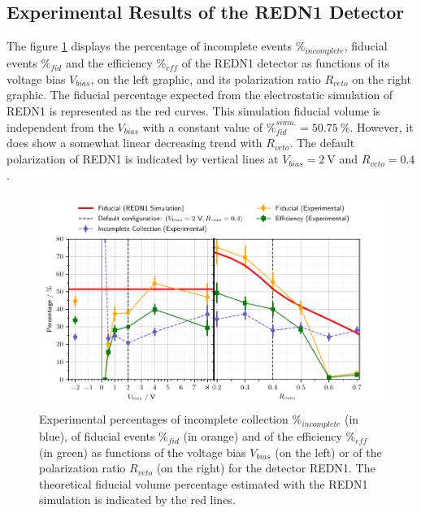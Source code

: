\subsection{Experimental Results of the REDN1 Detector}

The figure \ref{fig:redn1-experimental-fiducial-volume} displays the percentage of incomplete events $\%_{incomplete}$, fiducial events $\%_{fid}$ and the efficiency $\%_{eff}$ of the REDN1 detector as functions of its voltage bias $V_{bias}$, on the left graphic, and its polarization ratio $R_{veto}$ on the right graphic. The fiducial percentage expected from the electrostatic simulation of REDN1 is represented as the red curves. This simulation fiducial volume is independent from the $V_{bias}$ with a constant value of $\%_{fid}^{simu.}=\SI{50.75}{\percent}$. However, it does show a somewhat linear decreasing trend with $R_{veto}$. The default polarization of REDN1 is indicated by vertical lines at $V_{bias}=\SI{2}{\volt}$ and $R_{veto}=0.4$.

\begin{figure}
\centering
\includegraphics[scale=1]{Figures/ElectrodesExperimental/redn1_experimental_fiducial_volume.pdf}
\caption{Experimental percentages of incomplete collection $\%_{incomplete}$ (in blue), of fiducial events $\%_{fid}$ (in orange) and of the efficiency $\%_{eff}$ (in green) as functions of the voltage bias $V_{bias}$ (on the left) or of the polarization ratio $R_{veto}$ (on the right) for the detector REDN1. The theoretical fiducial volume percentage estimated with the REDN1 simulation is indicated by the red lines.}
\label{fig:redn1-experimental-fiducial-volume}
\end{figure}

